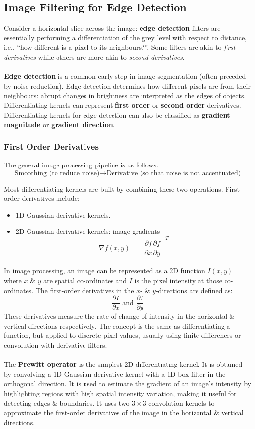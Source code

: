 \documentclass[a4paper,11pt]{article}
\begin{document}
\subsection{Image Filtering for Edge Detection}
Consider a horizontal slice across the image: \textbf{edge detection} filters are essentially performing a differentiation of the grey level with respect to distance, i.e., ``how different is a pixel to its neighbours?''.
Some filters are akin to \textit{first derivatives} while others are more akin to \textit{second derivatives}.
\\\\
\textbf{Edge detection} is a common early step in image segmentation (often preceded by noise reduction).
Edge detection determines how different pixels are from their neighbours: abrupt changes in brightness are interpreted as the edges of objects.
Differentiating kernels can represent \textbf{first order} or \textbf{second order} derivatives.
Differentiating kernels for edge detection can also be classified as \textbf{gradient magnitude} or \textbf{gradient direction}.

\subsubsection{First Order Derivatives}
The general image processing pipeline is as follows:
\[
    \text{Smoothing (to reduce noise)} \rightarrow \text{Derivative (so that noise is not accentuated)}
\]

Most differentiating kernels are built by combining these two operations.
First order derivatives include:
\begin{itemize}
    \item   1D Gaussian derivative kernels.
    \item   2D Gaussian derivative kernels: image gradients
            \[
                \nabla f(x,y) = \left[ \frac{\partial f}{\partial x} \frac{\partial f}{\partial y} \right]^T
            \]
\end{itemize}

In image processing, an image can be represented as a 2D function $I(x,y)$ where $x$ \& $y$ are spatial co-ordinates and $I$ is the pixel intensity at those co-ordinates.
The first-order derivatives in the $x$- \& $y$-directions are defined as:
\[
    \frac{\partial I}{\partial x} \text{ and } \frac{\partial I}{\partial y}
\]
These derivatives measure the rate of change of intensity in the horizontal \& vertical directions respectively.
The concept is the same as differentiating a function, but applied to discrete pixel values, usually using finite differences or convolution with derivative filters.
\\\\
The \textbf{Prewitt operator} is the simplest 2D differentiating kernel.
It is obtained by convolving a 1D Gaussian derivative kernel with a 1D box filter in the orthogonal direction.
It is used to estimate the gradient of an image's intensity by highlighting regions with high spatial intensity variation, making it useful for detecting edges \& boundaries.
It uses two $3 \times 3$ convolution kernels to approximate the first-order derivatives of the image in the horizontal \& vertical directions.
\end{document}
